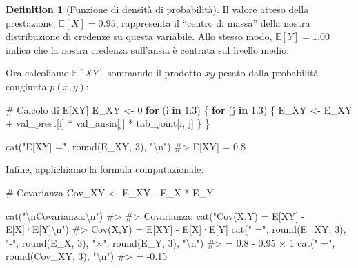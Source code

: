\documentclass[
  letterpaper,
  DIV=11,
  numbers=noendperiod,
  oneside]{scrreprt}
\newenvironment{Shaded}{\begin{snugshade}}{\end{snugshade}}
\newcommand{\CommentTok}[1]{\textcolor[rgb]{0.37,0.37,0.37}{#1}}
\newcommand{\ControlFlowTok}[1]{\textcolor[rgb]{0.00,0.23,0.31}{\textbf{#1}}}
\newcommand{\DecValTok}[1]{\textcolor[rgb]{0.68,0.00,0.00}{#1}}
\newcommand{\FunctionTok}[1]{\textcolor[rgb]{0.28,0.35,0.67}{#1}}
\newcommand{\NormalTok}[1]{\textcolor[rgb]{0.00,0.23,0.31}{#1}}
\newcommand{\OtherTok}[1]{\textcolor[rgb]{0.00,0.23,0.31}{#1}}
\newcommand{\SpecialCharTok}[1]{\textcolor[rgb]{0.37,0.37,0.37}{#1}}
\newcommand{\StringTok}[1]{\textcolor[rgb]{0.13,0.47,0.30}{#1}}
\theoremstyle{definition}
\theoremstyle{plain}
\theoremstyle{definition}
\newtheorem{definition}{Definition}[chapter]
\theoremstyle{remark}
\begin{document}
\begin{definition}[Funzione di densità di
probabilità]
Il valore atteso della prestazione, \(\mathbb{E}[X] = 0.95\),
rappresenta il ``centro di massa'' della nostra distribuzione di
credenze su questa variabile. Allo stesso modo, \(\mathbb{E}[Y] = 1.00\)
indica che la nostra credenza sull'ansia è centrata sul livello medio.

Ora calcoliamo \(\mathbb{E}[XY]\) sommando il prodotto \(xy\) pesato
dalla probabilità congiunta \(p(x,y)\):

\begin{Shaded}
\begin{Highlighting}[]
\CommentTok{\# Calcolo di E[XY]}
\NormalTok{E\_XY }\OtherTok{\textless{}{-}} \DecValTok{0}
\ControlFlowTok{for}\NormalTok{ (i }\ControlFlowTok{in} \DecValTok{1}\SpecialCharTok{:}\DecValTok{3}\NormalTok{) \{}
  \ControlFlowTok{for}\NormalTok{ (j }\ControlFlowTok{in} \DecValTok{1}\SpecialCharTok{:}\DecValTok{3}\NormalTok{) \{}
\NormalTok{    E\_XY }\OtherTok{\textless{}{-}}\NormalTok{ E\_XY }\SpecialCharTok{+}\NormalTok{ val\_prest[i] }\SpecialCharTok{*}\NormalTok{ val\_ansia[j] }\SpecialCharTok{*}\NormalTok{ tab\_joint[i, j]}
\NormalTok{  \}}
\NormalTok{\}}

\FunctionTok{cat}\NormalTok{(}\StringTok{"E[XY] ="}\NormalTok{, }\FunctionTok{round}\NormalTok{(E\_XY, }\DecValTok{3}\NormalTok{), }\StringTok{"}\SpecialCharTok{\textbackslash{}n}\StringTok{"}\NormalTok{)}
\CommentTok{\#\textgreater{} E[XY] = 0.8}
\end{Highlighting}
\end{Shaded}

Infine, applichiamo la formula computazionale:

\begin{Shaded}
\begin{Highlighting}[]
\CommentTok{\# Covarianza}
\NormalTok{Cov\_XY }\OtherTok{\textless{}{-}}\NormalTok{ E\_XY }\SpecialCharTok{{-}}\NormalTok{ E\_X }\SpecialCharTok{*}\NormalTok{ E\_Y}

\FunctionTok{cat}\NormalTok{(}\StringTok{"}\SpecialCharTok{\textbackslash{}n}\StringTok{Covarianza:}\SpecialCharTok{\textbackslash{}n}\StringTok{"}\NormalTok{)}
\CommentTok{\#\textgreater{} }
\CommentTok{\#\textgreater{} Covarianza:}
\FunctionTok{cat}\NormalTok{(}\StringTok{"Cov(X,Y) = E[XY] {-} E[X]·E[Y]}\SpecialCharTok{\textbackslash{}n}\StringTok{"}\NormalTok{)}
\CommentTok{\#\textgreater{} Cov(X,Y) = E[XY] {-} E[X]·E[Y]}
\FunctionTok{cat}\NormalTok{(}\StringTok{"         ="}\NormalTok{, }\FunctionTok{round}\NormalTok{(E\_XY, }\DecValTok{3}\NormalTok{), }\StringTok{"{-}"}\NormalTok{, }\FunctionTok{round}\NormalTok{(E\_X, }\DecValTok{3}\NormalTok{), }\StringTok{"×"}\NormalTok{, }\FunctionTok{round}\NormalTok{(E\_Y, }\DecValTok{3}\NormalTok{), }\StringTok{"}\SpecialCharTok{\textbackslash{}n}\StringTok{"}\NormalTok{)}
\CommentTok{\#\textgreater{}          = 0.8 {-} 0.95 × 1}
\FunctionTok{cat}\NormalTok{(}\StringTok{"         ="}\NormalTok{, }\FunctionTok{round}\NormalTok{(Cov\_XY, }\DecValTok{3}\NormalTok{), }\StringTok{"}\SpecialCharTok{\textbackslash{}n}\StringTok{"}\NormalTok{)}
\CommentTok{\#\textgreater{}          = {-}0.15}
\end{Highlighting}
\end{Shaded}


\end{definition}
\end{document}
